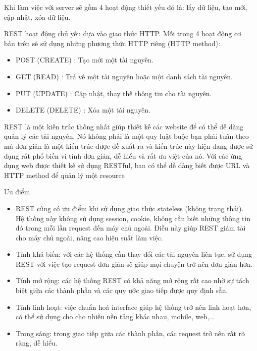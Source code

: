 \begin{itemize}
		    Khi làm việc với server sẽ gồm 4 hoạt động thiết yếu đó là: lấy dữ liệu, tạo mới, cập nhật, xóa dữ liệu.
		    
		    REST hoạt động chủ yếu dựa vào giao thức HTTP. Mỗi trong 4 hoạt động cơ bản trên sẽ sử dụng những phương thức HTTP riêng (HTTP method):
		    \begin{itemize}
		        \item POST (CREATE) : Tạo mới một tài nguyên.
		        \item GET (READ) : Trả về một tài nguyên hoặc một danh sách tài nguyên.
		        \item PUT (UPDATE) : Cập nhật, thay thế thông tin cho tài nguyên.
		        \item DELETE (DELETE) : Xóa một tài nguyên.
		    \end{itemize}
		    REST là một kiến trúc thống nhất giúp thiết kế các website để có thể dễ dàng quản lý các tài nguyên. Nó không phải là một quy luật buộc bạn phải tuân theo mà đơn giản là một kiến trúc được đề xuất ra và kiến trúc này hiện đang được sử dụng rất phổ biến vì tính đơn giản, dễ hiểu và rất ưu việt của nó. Với các ứng dụng web được thiết kế sử dụng RESTful, ban có thể dễ dàng biết được URL và HTTP method để quản lý một resource
		    
		    Ưu điểm
		  
	        \begin{itemize}
	            \item REST cũng có ưu điểm khi sử dụng giao thức stateless (không trạng thái). Hệ thống này không sử dụng session, cookie, không cần biết những thông tin đó trong mỗi lần request đến máy chủ ngoài. Điều này giúp REST giảm tải cho máy chủ ngoài, nâng cao hiệu suất làm việc.
	            \item Tính khả biến: với các hệ thống cần thay đổi các tài nguyên liên tục, sử dụng REST với việc tạo request đơn giản sẽ giúp mọi chuyện trở nên đơn giản hơn.
	            \item Tính mở rộng: các hệ thống REST có khả năng mở rộng rất cao nhờ sự tách biệt giữa các thành phần và các quy ước giao tiếp được quy định sẵn.
	            \item Tính linh hoạt: việc chuẩn hoá interface giúp hệ thống trở nên linh hoạt hơn, có thể sử dụng cho cho nhiều nền tảng khác nhau, mobile, web,...
	            \item Trong sáng: trong giao tiếp giữa các thành phần, các request trở nên rất rõ ràng, dễ hiểu.
	        \end{itemize}
	        

\end{itemize}
